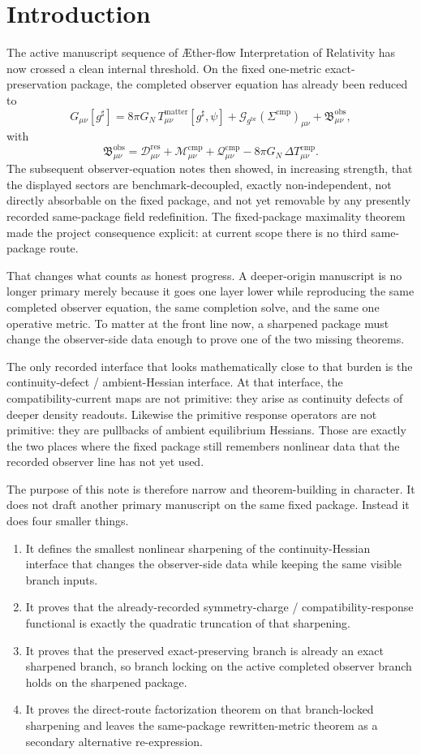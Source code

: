 \documentclass[11pt]{article}
\newcommand{\Aflow}{\AE{}ther-flow}
\newcommand{\TheoryName}{\Aflow{} Interpretation of Relativity}
\newcommand{\ObserverMetric}{g^{\mathrm{br}}}
\newcommand{\CompletedMetric}{g^{\sharp}}
\newcommand{\CompShift}{\Sigma^{\mathrm{cmp}}}
\newcommand{\ResidualDec}{\mathcal D_{\mu\nu}^{\mathrm{res}}}
\newcommand{\GaugeBook}{\mathcal G_{\ObserverMetric}}
\newcommand{\CompMix}{\mathcal M_{\mu\nu}^{\mathrm{cmp}}}
\newcommand{\CompQuad}{\mathcal Q_{\mu\nu}^{\mathrm{cmp}}}
\newcommand{\DeltaTComp}{\Delta T_{\mu\nu}^{\mathrm{cmp}}}
\newcommand{\ObsBurden}{\mathfrak B_{\mu\nu}^{\mathrm{obs}}}
\begin{document}
\section{Introduction}

The active manuscript sequence of \TheoryName{} has now crossed a clean internal threshold. On the fixed one-metric exact-preservation package, the completed observer equation has already been reduced to
\[
G_{\mu\nu}[\CompletedMetric]
=
8\pi G_N\,T_{\mu\nu}^{\mathrm{matter}}[\CompletedMetric,\psi]
+\GaugeBook(\CompShift)_{\mu\nu}
+\ObsBurden,
\]
with
\[
\ObsBurden
=
\ResidualDec+\CompMix+\CompQuad-8\pi G_N\,\DeltaTComp.
\]
The subsequent observer-equation notes then showed, in increasing strength, that the displayed sectors are benchmark-decoupled, exactly non-independent, not directly absorbable on the fixed package, and not yet removable by any presently recorded same-package field redefinition. The fixed-package maximality theorem made the project consequence explicit: at current scope there is no third same-package route.

That changes what counts as honest progress. A deeper-origin manuscript is no longer primary merely because it goes one layer lower while reproducing the same completed observer equation, the same completion solve, and the same one operative metric. To matter at the front line now, a sharpened package must change the observer-side data enough to prove one of the two missing theorems.

The only recorded interface that looks mathematically close to that burden is the continuity-defect / ambient-Hessian interface. At that interface, the compatibility-current maps are not primitive: they arise as continuity defects of deeper density readouts. Likewise the primitive response operators are not primitive: they are pullbacks of ambient equilibrium Hessians. Those are exactly the two places where the fixed package still remembers nonlinear data that the recorded observer line has not yet used.

The purpose of this note is therefore narrow and theorem-building in character. It does not draft another primary manuscript on the same fixed package. Instead it does four smaller things.
\begin{enumerate}
    \item It defines the smallest nonlinear sharpening of the continuity-Hessian interface that changes the observer-side data while keeping the same visible branch inputs.
    \item It proves that the already-recorded symmetry-charge / compatibility-response functional is exactly the quadratic truncation of that sharpening.
    \item It proves that the preserved exact-preserving branch is already an exact sharpened branch, so branch locking on the active completed observer branch holds on the sharpened package.
    \item It proves the direct-route factorization theorem on that branch-locked sharpening and leaves the same-package rewritten-metric theorem as a secondary alternative re-expression.
\end{enumerate}
\end{document}
